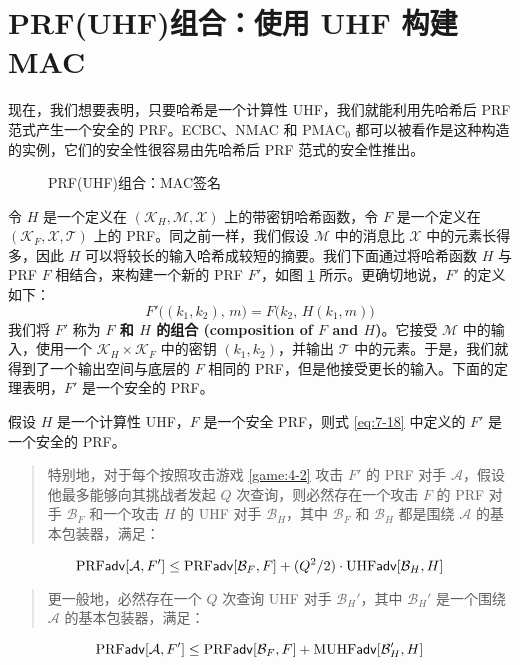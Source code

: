 \section{PRF(UHF)组合：使用 UHF 构建 MAC}\label{sec:7-3}

现在，我们想要表明，只要哈希是一个计算性 UHF，我们就能利用先哈希后 PRF 范式产生一个安全的 PRF。ECBC、NMAC 和 $\mathrm{PMAC}_0$ 都可以被看作是这种构造的实例，它们的安全性很容易由先哈希后 PRF 范式的安全性推出。

\begin{figure}
  \centering
  
  \caption{PRF(UHF)组合：MAC签名}
  \label{fig:7-3}
\end{figure}

令 $H$ 是一个定义在 $(\mathcal{K}_H,\mathcal{M},\mathcal{X})$ 上的带密钥哈希函数，令 $F$ 是一个定义在 $(\mathcal{K}_F,\mathcal{X},\mathcal{T})$ 上的 PRF。同之前一样，我们假设 $\mathcal{M}$ 中的消息比 $\mathcal{X}$ 中的元素长得多，因此 $H$ 可以将较长的输入哈希成较短的摘要。我们下面通过将哈希函数 $H$ 与 PRF $F$ 相结合，来构建一个新的 PRF $F'$，如图 \ref{fig:7-3} 所示。更确切地说，$F'$ 的定义如下：
\begin{equation}\label{eq:7-18}
F'\big((k_1,k_2),\,m\big)=F\big(k_2,\,H(k_1,m)\big)
\end{equation}
我们将 $F'$ 称为 \textbf{$F$ 和 $H$ 的组合 (composition of $F$ and $H$)}。它接受 $\mathcal{M}$ 中的输入，使用一个 $\mathcal{K}_H\times\mathcal{K}_F$ 中的密钥 $(k_1,k_2)$，并输出 $\mathcal{T}$ 中的元素。于是，我们就得到了一个输出空间与底层的 $F$ 相同的 PRF，但是他接受更长的输入。下面的定理表明，$F'$ 是一个安全的 PRF。

\begin{theorem}\label{theo:7-7}
假设 $H$ 是一个计算性 UHF，$F$ 是一个安全 PRF，则式 \ref{eq:7-18} 中定义的 $F'$ 是一个安全的 PRF。
\begin{quote}
特别地，对于每个按照攻击游戏 \ref{game:4-2} 攻击 $F'$ 的 PRF 对手 $\mathcal{A}$，假设他最多能够向其挑战者发起 $Q$ 次查询，则必然存在一个攻击 $F$ 的 PRF 对手 $\mathcal{B}_F$ 和一个攻击 $H$ 的 UHF 对手 $\mathcal{B}_H$，其中 $\mathcal{B}_F$ 和 $\mathcal{B}_H$ 都是围绕 $\mathcal{A}$ 的基本包装器，满足：
\end{quote}
\begin{equation}\label{eq:7-19}
{\rm PRF}\mathsf{adv}[\mathcal{A},F']\leq{\rm PRF}\mathsf{adv}[\mathcal{B}_F,F]+{(Q^2/2)}\cdot{\rm UHF}\mathsf{adv}[\mathcal{B}_H,H]
\end{equation}
\begin{quote}
更一般地，必然存在一个 $Q$ 次查询 UHF 对手 $\mathcal{B}_H'$，其中 $\mathcal{B}_H'$ 是一个围绕 $\mathcal{A}$ 的基本包装器，满足：
\end{quote}
\begin{equation}\label{eq:7-20}
{\rm PRF}\mathsf{adv}[\mathcal{A},F']\leq{\rm PRF}\mathsf{adv}[\mathcal{B}_F,F]+{\rm MUHF}\mathsf{adv}[\mathcal{B}_H',H]
\end{equation}
\end{theorem}

